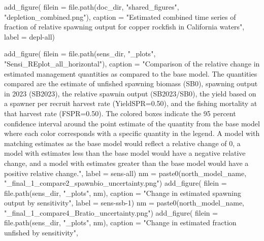 \documentclass[
  letterpaper,
]{article}
\newenvironment{Shaded}{\begin{snugshade}}{\end{snugshade}}
\newcommand{\AttributeTok}[1]{\textcolor[rgb]{0.77,0.63,0.00}{#1}}
\newcommand{\FunctionTok}[1]{\textcolor[rgb]{0.00,0.00,0.00}{#1}}
\newcommand{\NormalTok}[1]{#1}
\newcommand{\OtherTok}[1]{\textcolor[rgb]{0.56,0.35,0.01}{#1}}
\newcommand{\StringTok}[1]{\textcolor[rgb]{0.31,0.60,0.02}{#1}}
\begin{document}
\begin{Shaded}
\begin{Highlighting}[]
\FunctionTok{add\_figure}\NormalTok{(}
\AttributeTok{filein =} \FunctionTok{file.path}\NormalTok{(doc\_dir, }\StringTok{"shared\_figures"}\NormalTok{, }\StringTok{"depletion\_combined.png"}\NormalTok{), }
\AttributeTok{caption =} \StringTok{"Estimated combined time series of fraction of relative spawning output for copper rockfish in California waters"}\NormalTok{,}
\AttributeTok{label =} \StringTok{\textquotesingle{}depl{-}all\textquotesingle{}}\NormalTok{)}

\FunctionTok{add\_figure}\NormalTok{(}
\AttributeTok{filein =} \FunctionTok{file.path}\NormalTok{(sens\_dir, }\StringTok{"\_plots"}\NormalTok{,  }\StringTok{"Sensi\_REplot\_all\_horizontal"}\NormalTok{),}
\AttributeTok{caption =} \StringTok{"Comparison of the relative change in estimated management quantities as compared to the base model. The quantities compared are the estimate of unfished spawning biomass (SB0), spawning output in 2023 (SB2023), the relative spawnin output (SB2023/SB0), the yield based on a spawner per recruit harvest rate (YieldSPR=0.50), and the fishing mortality at that harvest rate (FSPR=0.50). The colored boxes indicate the 95 percent confidence interval around the point estimate of the quantity from the base model where each color corresponds with a specific quantity in the legend.  A model with matching estimates as the base model would reflect a relative change of 0, a model with estimates less than the base model would have a negative relative change, and a model with estimates greater than the base model would have a positive relative change."}\NormalTok{,}
\AttributeTok{label =} \StringTok{\textquotesingle{}sens{-}all\textquotesingle{}}\NormalTok{)}
\NormalTok{nm }\OtherTok{=} \FunctionTok{paste0}\NormalTok{(north\_model\_name, }\StringTok{"\_final\_1\_compare2\_spawnbio\_uncertainty.png"}\NormalTok{)}
\FunctionTok{add\_figure}\NormalTok{(}
\AttributeTok{filein =} \FunctionTok{file.path}\NormalTok{(sens\_dir, }\StringTok{"\_plots"}\NormalTok{,  nm),}
\AttributeTok{caption =} \StringTok{"Change in estimated spawning output by sensitivity"}\NormalTok{,}
\AttributeTok{label =} \StringTok{\textquotesingle{}sens{-}ssb{-}1\textquotesingle{}}\NormalTok{)}
\NormalTok{nm }\OtherTok{=} \FunctionTok{paste0}\NormalTok{(north\_model\_name, }\StringTok{"\_final\_1\_compare4\_Bratio\_uncertainty.png"}\NormalTok{)}
\FunctionTok{add\_figure}\NormalTok{(}
\AttributeTok{filein =} \FunctionTok{file.path}\NormalTok{(sens\_dir, }\StringTok{"\_plots"}\NormalTok{, nm),}
\AttributeTok{caption =} \StringTok{"Change in estimated fraction unfished by sensitivity"}\NormalTok{,}

\end{Highlighting}
\end{Shaded}
\end{document}
